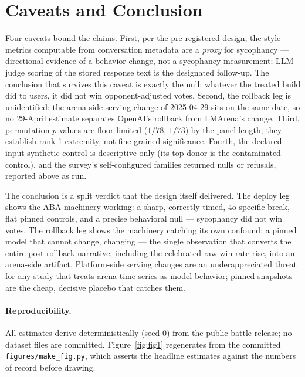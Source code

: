 \documentclass[11pt]{article}
\begin{document}
\section{Caveats and Conclusion}\label{sec:conclusion}

Four caveats bound the claims. First, per the pre-registered design, the
style metrics computable from conversation metadata are a \emph{proxy} for
sycophancy --- directional evidence of a behavior change, not a sycophancy
measurement; LLM-judge scoring of the stored response text is the designated
follow-up. The conclusion that survives this caveat is exactly the null:
whatever the treated build did to users, it did not win opponent-adjusted
votes. Second, the rollback leg is unidentified: the arena-side serving
change of 2025-04-29 sits on the same date, so no 29-April estimate separates
OpenAI's rollback from LMArena's change. Third, permutation $p$-values are
floor-limited ($1/78$, $1/73$) by the panel length; they establish rank-1
extremity, not fine-grained significance. Fourth, the declared-input
synthetic control is descriptive only (its top donor is the contaminated
control), and the survey's self-configured families returned nulls or
refusals, reported above as run.

The conclusion is a split verdict that the design itself delivered. The
deploy leg shows the ABA machinery working: a sharp, correctly timed,
4o-specific break, flat pinned controls, and a precise behavioral null ---
sycophancy did not win votes. The rollback leg shows the machinery catching
its own confound: a pinned model that cannot change, changing --- the single
observation that converts the entire post-rollback narrative, including the
celebrated raw win-rate rise, into an arena-side artifact. Platform-side
serving changes are an underappreciated threat for any study that treats
arena time series as model behavior; pinned snapshots are the cheap,
decisive placebo that catches them.

\paragraph{Reproducibility.} All estimates derive deterministically (seed 0)
from the public battle release; no dataset files are committed.
Figure~\ref{fig:fig1} regenerates from the committed
\texttt{figures/make\_fig.py}, which asserts the headline estimates against
the numbers of record before drawing.
\end{document}
